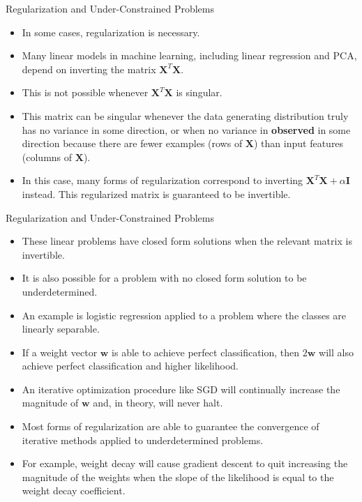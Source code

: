 \documentclass[10pt]{beamer}
\begin{document}
	\begin{frame}{Regularization and Under-Constrained Problems}
		\begin{itemize}
			\item In some cases, regularization is necessary.
			\pause
			\item Many linear models in machine learning, including linear regression and PCA, depend on inverting the matrix $\bm{X}^T\bm{X}$.
			\pause
			\item This is not possible whenever $\bm{X}^T\bm{X}$ is singular.
			\pause
			\item This matrix can be singular whenever the data generating distribution truly has no variance in some direction, or when no variance in \textbf{observed} in some direction because there are fewer examples (rows of $\bm{X}$) than input features (columns of $\bm{X}$).
			\pause
			\item In this case, many forms of regularization correspond to inverting $\bm{X}^T\bm{X}+\alpha\bm{I}$ instead. This regularized matrix is guaranteed to be invertible.
		\end{itemize}
	\end{frame}

	\begin{frame}{Regularization and Under-Constrained Problems}
		\begin{itemize}
			\item These linear problems have closed form solutions when the relevant matrix is invertible. 
			\pause
			\item It is also possible for a problem with no closed form solution to be underdetermined.
			\pause
			\item An example is logistic regression applied to a problem where the classes are linearly separable.
			\pause
			\item If a weight vector $\bm{w}$ is able to achieve perfect classification, then $2\bm{w}$ will also achieve perfect classification and higher likelihood.
			\pause
			\item An iterative optimization procedure like SGD will continually increase the magnitude of $\bm{w}$ and, in theory, will never halt.
			\pause
			\item Most forms of regularization are able to guarantee the convergence of iterative methods applied to underdetermined problems.
			\pause
			\item For example, weight decay will cause gradient descent to quit increasing the magnitude of the weights when the slope of the likelihood is equal to the weight decay coefficient.
		\end{itemize}
	\end{frame}
	
\end{document}
